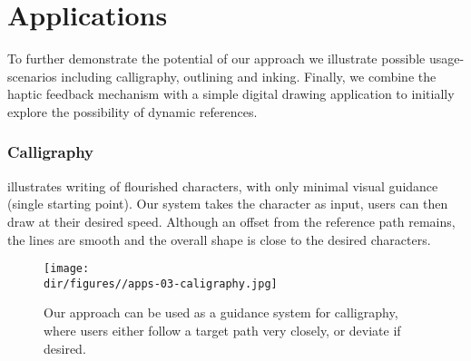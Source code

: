
\section{Applications}
To further demonstrate the potential of our approach we illustrate possible usage-scenarios including calligraphy, outlining and inking. 
Finally, we combine the haptic feedback mechanism with a simple digital drawing application to initially explore the possibility of dynamic references.    

\subsubsection*{Calligraphy}
 illustrates writing of flourished characters, with only minimal visual guidance (single starting point). 
Our system takes the character as input, users can then draw at their desired speed. 
Although an offset from the reference path remains, the lines are smooth and the overall shape is close to the desired characters. 

\begin{figure}[!t]
    \centering
        \texttt{[image: \\dir/figures//apps-03-caligraphy.jpg]}    
        \caption{Our approach can be used as a guidance system for calligraphy, where users either follow a target path very closely, or deviate if desired.}
    \label{fig:caligraphy}
\end{figure}
%
%

